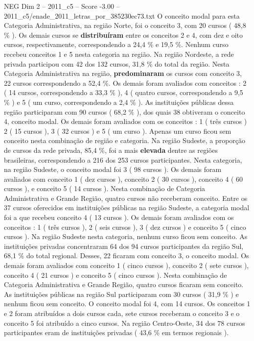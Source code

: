 \begin{textsample}{NEG Dim 2 – 2011\_c5 – Score -3.00 – 2011\_c5/enade\_2011\_letras\_por\_385230ec73.txt}
O conceito modal para esta Categoria Administrativa, na região Norte, foi o conceito 3, com 20 cursos ( 48,8 \% ).
Os demais cursos se \textbf{distribuíram} entre os conceitos 2 e 4, com dez e oito cursos, respectivamente, correspondendo a 24,4 \% e 19,5 \%.
Nenhum curso recebeu conceitos 1 e 5 nesta categoria na região.
Na região Nordeste, a rede privada participou com 42 dos 132 cursos, 31,8 \% do total da região.
Nesta Categoria Administrativa na região, \textbf{predominaram} os cursos com conceito 3, 22 cursos correspondendo a 52,4 \%.
Os demais foram avaliados com conceitos : 2 ( 14 cursos, correspondendo a 33,3 \% ), 4 ( quatro cursos, correspondendo a 9,5 \% ) e 5 ( um curso, correspondendo a 2,4 \% ).
As instituições públicas dessa região participaram com 90 cursos ( 68,2 \% ), dos quais 38 obtiveram o conceito 4, conceito modal.
Os demais foram avaliados com os conceitos : 1 ( três cursos ) 2 ( 15 cursos ), 3 ( 32 cursos ) e 5 ( um curso ).
Apenas um curso ficou sem conceito nesta combinação de região e categoria.
Na região Sudeste, a proporção de cursos da rede privada, 85,4 \%, foi a mais \textbf{elevada} dentre as regiões brasileiras, correspondendo a 216 dos 253 cursos participantes.
Nesta categoria, na região Sudeste, o conceito modal foi 3 ( 98 cursos ).
Os demais foram avaliados com conceito 1 ( dez cursos ), conceito 2 ( 30 cursos ), conceito 4 ( 60 cursos ), e conceito 5 ( 14 cursos ).
Nesta combinação de Categoria Administrativa e Grande Região, quatro cursos não receberam conceito.
Entre os 37 cursos oferecidos em instituições públicas na região Sudeste, a categoria modal foi a que recebeu conceito 4 ( 13 cursos ).
Os demais foram avaliados com os conceitos : 1 ( três cursos ), 2 ( seis cursos ), 3 ( dez cursos ) e conceito 5 ( cinco cursos ).
Na região Sudeste nesta categoria, nenhum curso ficou sem conceito.
As instituições privadas concentraram 64 dos 94 cursos participantes da região Sul, 68,1 \% do total regional.
Desses, 22 ficaram com conceito 3, o conceito modal.
Os demais foram avaliados com conceito 1 ( cinco cursos ), conceito 2 ( sete cursos ), conceito 4 ( 21 cursos ) e conceito 5 ( cinco cursos ).
Nesta combinação de Categoria Administrativa e Grande Região, quatro cursos ficaram sem conceito.
As instituições públicas na região Sul participaram com 30 cursos ( 31,9 \% ) e nenhum ficou sem conceito.
O conceito modal foi 4, com 14 cursos.
Os conceitos 1 e 2 foram atribuídos a dois cursos cada, sete cursos receberam o conceito 3 e o conceito 5 foi atribuído a cinco cursos.
Na região Centro-Oeste, 34 dos 78 cursos participantes eram de instituições privadas ( 43,6 \% em termos regionais ).

\end{textsample}
